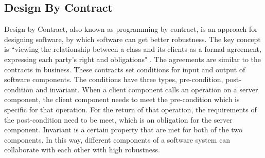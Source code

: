 
%


\subsection{Design By Contract}
Design by Contract, also known as programming by contract, is an approach for designing software, by which software can get better robustness. The key concept is ``viewing the relationship between a class and its clients as a formal agreement, expressing each party's right and obligations" \cite{jj}. The agreements are similar to the contracts in business. These contracts set conditions for input and output of software components. The conditions have three types, pre-condition, post-condition and invariant. When a client component calls an operation on a server component, the client component needs to meet the pre-condition which is specific for that operation. For the return of that operation, the requirements of the post-condition need to be meet, which is an obligation for the server component. Invariant is a certain property that are met for both of the two components. In this way, different components of a software system can collaborate with each other with high robustness. 

